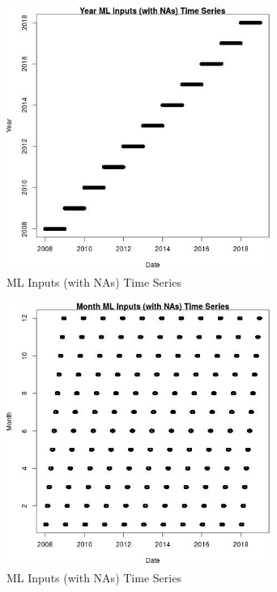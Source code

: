 \begin{figure} 
\centering  
\includegraphics[width=0.77\textwidth]{Code_Outputs/Report_ML_input_PM25_Step4_part_e_de_duplicated_aves_compiled_2019-05-21wNAs_YearvDate.jpg} 
\caption{\label{fig:Report_ML_input_PM25_Step4_part_e_de_duplicated_aves_compiled_2019-05-21wNAsYearvDate}ML Inputs (with NAs) Time Series} 
\end{figure} 
 

\begin{figure} 
\centering  
\includegraphics[width=0.77\textwidth]{Code_Outputs/Report_ML_input_PM25_Step4_part_e_de_duplicated_aves_compiled_2019-05-21wNAs_MonthvDate.jpg} 
\caption{\label{fig:Report_ML_input_PM25_Step4_part_e_de_duplicated_aves_compiled_2019-05-21wNAsMonthvDate}ML Inputs (with NAs) Time Series} 
\end{figure} 
 

